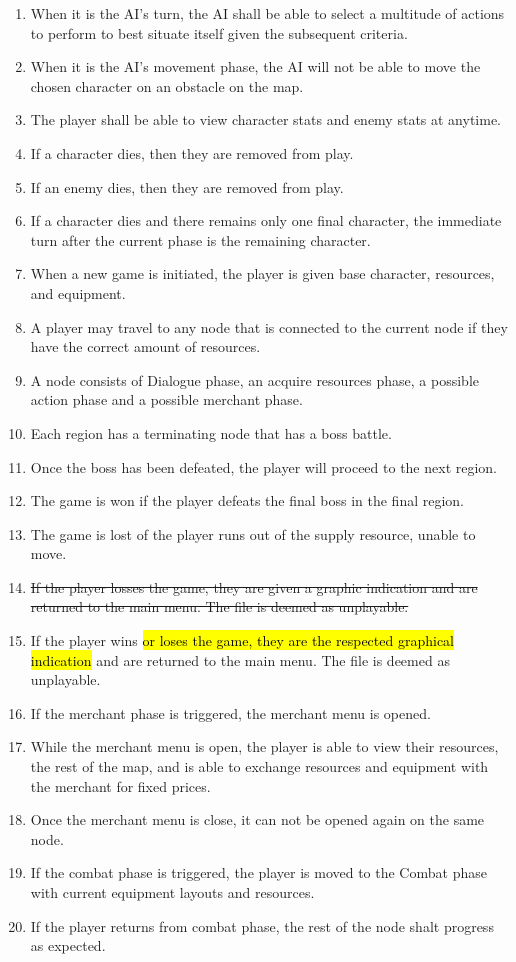 \documentclass{article}
\begin{document}
\begin{enumerate}[{PGR}1. ]
	\item When it is the AI's turn, the AI shall be able to select a multitude of actions to perform to best situate itself given the  subsequent criteria.
	\item When it is the AI's movement phase, the AI will not be able to move the chosen character on an obstacle on the map.
	\item The player shall be able to view character stats and enemy stats at anytime.
	\item If a character dies, then they are removed from play.
	\item If an enemy dies, then they are removed from play.
	\item If a character dies and there remains only one final character, the immediate turn after the current phase is the remaining character.
	\item When a new game is initiated, the player is given base character, resources, and equipment.
	\item A player may travel to any node that is connected to the current node if they have the correct amount of resources.
	\item A node consists of Dialogue phase, an acquire resources phase, a possible action phase and a possible merchant phase.
	\item Each region has a terminating node that has a boss battle.
	\item Once the boss has been defeated, the player will proceed to the next region.
	\item The game is won if the player defeats the final boss in the final region.
	\item The game is lost of the player runs out of the supply resource, unable to move.
	\item \st{If the player losses the game, they are given a graphic indication and are returned to the main menu. The file is deemed as unplayable.}
	\item If the player wins \hl{or loses the game, they are the respected graphical indication} and are returned to the main menu. The file is deemed as unplayable.
	\item If the merchant phase is triggered, the merchant menu is opened.
	\item While the merchant menu is open, the player is able to view their resources, the rest of the map, and is able to exchange resources and equipment with the merchant for fixed prices.
	\item Once the merchant menu is close, it can not be opened again on the same node.
	\item If the combat phase is triggered, the player is moved to the Combat phase with current equipment layouts and resources.
	\item If the player returns from combat phase, the rest of the node shalt progress as expected.	
\end{enumerate}
\end{document}
